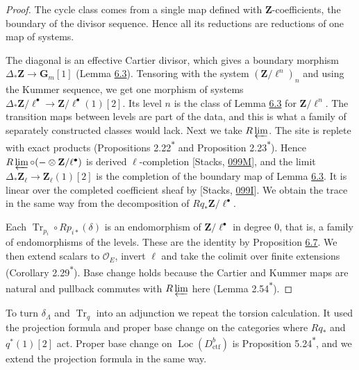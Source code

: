 \documentclass[11pt]{article}
\newcommand{\bpout}[1]{#1\textsuperscript{\hyperlink{bp-outside}{\ensuremath{\ast}}}}
\providecommand{\Loc}{}\renewcommand{\Loc}{\operatorname{Loc}}
\begin{document}
\begin{proof}[{Proof}]\label{bp70}%
The cycle class comes from a single map defined with \(\mathbf Z\)-coefficients, the boundary of the divisor sequence. Hence all its reductions are reductions of one map of systems.

The diagonal is an effective Cartier divisor, which gives a boundary morphism \(\Delta_*\mathbf Z\to\mathbf G_m[1]\) (Lemma \hyperref[bp11]{6.3}). Tensoring with the system \((\mathbf Z/\ell^n)_n\) and using the Kummer sequence, we get one morphism of systems \(\Delta_*\mathbf Z/\ell^\bullet\to\mathbf Z/\ell^\bullet(1)[2]\). Its level \(n\) is the class of Lemma \hyperref[bp11]{6.3} for \(\mathbf Z/\ell^n\). The transition maps between levels are part of the data, and this is what a family of separately constructed classes would lack. Next we take \(R\varprojlim\). The site is replete with exact products (Propositions \bpout{2.22} and \bpout{Proposition 2.23}). Hence \(R\varprojlim\circ(-\otimes\mathbf Z/\ell^\bullet)\) is derived \(\ell\)-completion [Stacks, \href{https://stacks.math.columbia.edu/tag/099M}{099M}], and the limit \(\Delta_*\mathbf Z_\ell\to\mathbf Z_\ell(1)[2]\) is the completion of the boundary map of Lemma \hyperref[bp11]{6.3}. It is linear over the completed coefficient sheaf by [Stacks, \href{https://stacks.math.columbia.edu/tag/099I}{099I}]. We obtain the trace in the same way from the decomposition of \(Rq_*\mathbf Z/\ell^\bullet\).

Each \(\operatorname{Tr}_{p_i}\circ Rp_{i*}(\delta)\) is an endomorphism of \(\mathbf Z/\ell^\bullet\) in degree \(0\), that is, a family of endomorphisms of the levels. These are the identity by Proposition \hyperref[bp22]{6.7}. We then extend scalars to \(\mathcal O_E\), invert \(\ell\) and take the colimit over finite extensions (Corollary \bpout{2.29}). Base change holds because the Cartier and Kummer maps are natural and pullback commutes with \(R\varprojlim\) here (Lemma \bpout{2.54}).
\end{proof}

\label{bp71}%
To turn \(\delta_\Lambda\) and \(\operatorname{Tr}_q\) into an adjunction we repeat the torsion calculation. It used the projection formula and proper base change on the categories where \(Rq_*\) and \(q^*(1)[2]\) act. Proper base change on \(\Loc(D^b_{\mathrm{ctf}})\) is Proposition \bpout{5.24}, and we extend the projection formula in the same way.
\end{document}
